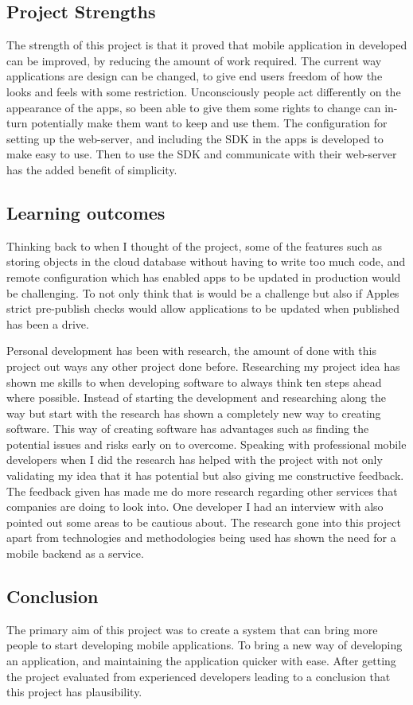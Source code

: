 \subsection{Project Strengths}

The strength of this project is that it proved that mobile application in developed can be improved, by reducing the amount of work required. The current way applications are design can be changed, to give end users freedom of how the looks and feels with some restriction. Unconsciously people act differently on the appearance of the apps, so been able to give them some rights to change can in-turn potentially make them want to keep and use them. The configuration for setting up the web-server, and including the SDK in the apps is developed to make easy to use. Then to use the SDK and communicate with their web-server has the added benefit of simplicity.

\subsection{Learning outcomes}

Thinking back to when I thought of the project, some of the features such as storing objects in the cloud database without having to write too much code, and remote configuration which has enabled apps to be updated in production would be challenging. To not only think that is would be a challenge but also if Apples strict pre-publish checks would allow applications to be updated when published has been a drive. 

Personal development has been with research, the amount of done with this project out ways any other project done before. Researching my project idea has shown me skills to when developing software to always think ten steps ahead where possible. Instead of starting the development and researching along the way but start with the research has shown a completely new way to creating software. This way of creating software has advantages such as finding the potential issues and risks early on to overcome.
Speaking with professional mobile developers when I did the research has helped with the project with not only validating my idea that it has potential but also giving me constructive feedback. The feedback given has made me do more research regarding other services that companies are doing to look into. One developer I had an interview with also pointed out some areas to be cautious about. The research gone into this project apart from technologies and methodologies being used has shown the need for a mobile backend as a service.

\subsection{Conclusion}
The primary aim of this project was to create a system that can bring more people to start developing mobile applications. To bring a new way of developing an application, and maintaining the application quicker with ease. After getting the project evaluated from experienced developers leading to a conclusion that this project has plausibility.